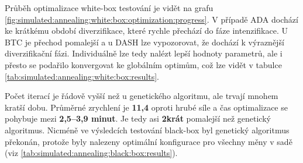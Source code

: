 \begin{table}[!htbp]
\centering
\caption[Nejlepší nalezené nastavení pro sadu white-box pro simulované ochlazování]{~Nejlepší nalezené nastavení pro sadu white-box pro simulované ochlazování}
\label{tab:simulated:annealing:setting}
\end{table}

Průběh optimalizace white-box testování je vidět na grafu \ref{fig:simulated:annealing:white:box:optimization:progress}.
V případě ADA dochází ke krátkému období diverzifikace, které rychle přechází do fáze intenzifikace.
U BTC je přechod pomalejší a u DASH lze vypozorovat, že dochází k výraznější diverzifikační fázi.
Individuálně lze tedy nalézt lepší hodnoty parametrů, ale i přesto se podařilo konvergovat ke globálním optimům, což lze vidět v tabulce \ref{tab:simulated:annealing:white:box:results}.

Počet iterací je řádově vyšší než u genetického algoritmu, ale trvají mnohem kratší dobu.
Průměrné zrychlení je \textbf{11,4} oproti hrubé síle a čas optimalizace se pohybuje mezi \textbf{2,5--3,9 minut}.
Je tedy asi \textbf{2krát} pomalejší než genetický algoritmus.
Nicméně ve výsledcích testování black-box byl genetický algoritmus překonán, protože byly nalezeny optimální konfigurace pro všechny měny v sadě (viz \ref{tab:simulated:annealing:black:box:results}).

